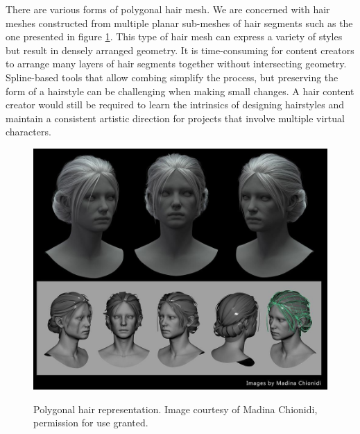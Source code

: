 \documentclass[ %
author={Dillon Keith Diep},
supervisor={Dr. Carl Henrik Ek},
degree={MEng},
title={ART-CG Hair:},
subtitle={Assisted Real-time Content Generation of Stylised Virtual Hair},
type={Research},
year={2017} ]{dissertation}
\begin{document}
	There are various forms of polygonal hair mesh. We are concerned with hair meshes constructed from multiple planar sub-meshes of hair segments such as the one presented in figure \ref{hairExemplar}. This type of hair mesh can express a variety of styles but result in densely arranged geometry. It is time-consuming for content creators to arrange many layers of hair segments together without intersecting geometry. Spline-based tools that allow combing simplify the process, but preserving the form of a hairstyle can be challenging when making small changes. A hair content creator would still be required to learn the intrinsics of designing hairstyles and maintain a consistent artistic direction for projects that involve multiple virtual characters.
	
	\begin{figure}[!h]
		\centering
		\caption{Polygonal hair representation. Image courtesy of Madina Chionidi, permission for use granted.}
		\includegraphics[scale=0.3]{images/hairExemplar}\\
		\label{hairExemplar}
	\end{figure}
	
\end{document}
